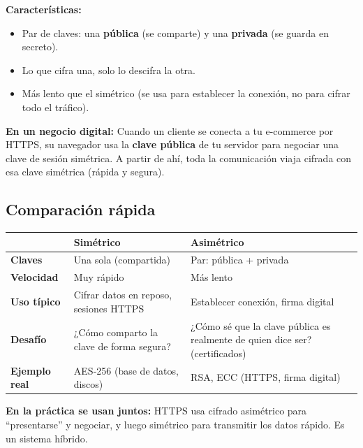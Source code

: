 \documentclass[12pt,a4paper]{article}
\renewcommand{\arraystretch}{1.25}
\begin{document}
\textbf{Caracter\'isticas:}
\begin{itemize}[leftmargin=2em]
  \item Par de claves: una \textbf{p\'ublica} (se comparte) y una \textbf{privada} (se guarda en secreto).
  \item Lo que cifra una, solo lo descifra la otra.
  \item M\'as lento que el sim\'etrico (se usa para establecer la conexi\'on, no para cifrar todo el tr\'afico).
\end{itemize}

\begin{cajaEjemplo}
\textbf{En un negocio digital:} Cuando un cliente se conecta a tu e-commerce por HTTPS, su navegador usa la \textbf{clave p\'ublica} de tu servidor para negociar una clave de sesi\'on sim\'etrica. A partir de ah\'i, toda la comunicaci\'on viaja cifrada con esa clave sim\'etrica (r\'apida y segura).
\end{cajaEjemplo}

\subsection{Comparaci\'on r\'apida}

\renewcommand{\arraystretch}{1.5}
\begin{tabularx}{\textwidth}{|>{\bfseries}p{3cm}|X|X|}
\hline
 & \textbf{Sim\'etrico} & \textbf{Asim\'etrico} \\
\hline
Claves & Una sola (compartida) & Par: p\'ublica + privada \\
\hline
Velocidad & Muy r\'apido & M\'as lento \\
\hline
Uso típico & Cifrar datos en reposo, sesiones HTTPS & Establecer conexi\'on, firma digital \\
\hline
Desaf\'io & ¿C\'omo comparto la clave de forma segura? & ¿C\'omo s\'e que la clave p\'ublica es realmente de quien dice ser? (certificados) \\
\hline
Ejemplo real & AES-256 (base de datos, discos) & RSA, ECC (HTTPS, firma digital) \\
\hline
\end{tabularx}

\begin{cajaNota}
\textbf{En la pr\'actica se usan juntos:} HTTPS usa cifrado asim\'etrico para ``presentarse'' y negociar, y luego sim\'etrico para transmitir los datos r\'apido. Es un sistema h\'ibrido.
\end{cajaNota}
\end{document}
